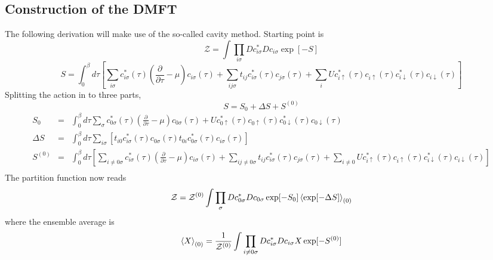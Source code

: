 \documentclass[a4paper]{article}
\begin{document}
\subsection{Construction of the DMFT} %
\label{sub:Construction of the DMFT}
The following derivation will make use of the so-called cavity method. Starting
point is
\begin{equation}
    \mathcal{Z} = \int \prod_{i\sigma} Dc^{*}_{i\sigma}Dc_{i\sigma} \exp [-S]
\end{equation}
\begin{equation}
    S = \int_{0}^{\beta} d\tau
        \left[
            \sum_{i\sigma} c^{*}_{i\sigma}(\tau)
            \left(\frac{\partial}{\partial\tau} - \mu \right)
            c_{i\sigma}(\tau)
           +\sum_{ij\sigma} t_{ij}c^{*}_{i\sigma}(\tau)c_{j\sigma}(\tau)
           +\sum_{i}Uc^{*}_{i\uparrow}(\tau)c_{i\uparrow}(\tau)
            c^{*}_{i\downarrow}(\tau)c_{i\downarrow}(\tau)
        \right]
\end{equation}
Splitting the action in to three parts,
\begin{equation}
    S = S_0 + \Delta S + S^{(0)}
\end{equation}
\begin{eqnarray}
    S_0 &=&
        \int_{0}^{\beta} d\tau
            \sum_{\sigma} c^{*}_{0\sigma}(\tau)
            \left(\frac{\partial}{\partial\tau} - \mu \right)
            c_{0\sigma}(\tau)
           +Uc^{*}_{0\uparrow}(\tau)c_{0\uparrow}(\tau)
            c^{*}_{0\downarrow}(\tau)c_{0\downarrow}(\tau) \\
    \Delta S &=&
        \int_{0}^{\beta} d\tau
            \sum_{i\sigma}
            [t_{i0}c^{*}_{i\sigma}(\tau)c_{0\sigma}(\tau)
             t_{0i}c^{*}_{0\sigma}(\tau)c_{i\sigma}(\tau)] \\
    S^{(0)} &=&
        \int_{0}^{\beta} d\tau
        \left[
            \sum_{i\neq0 \sigma}
                c^{*}_{i\sigma}(\tau)
                \left(\frac{\partial}{\partial\tau} - \mu \right)
                c_{i\sigma}(\tau)
           +\sum_{ij\neq0 \sigma}
                t_{ij}c^{*}_{i\sigma}(\tau)c_{j\sigma}(\tau)
           +\sum_{i\neq0}Uc^{*}_{i\uparrow}(\tau)c_{i\uparrow}(\tau)
            c^{*}_{i\downarrow}(\tau)c_{i\downarrow}(\tau)
        \right] \\
\end{eqnarray}
The partition function now reads
\begin{equation}
    \mathcal{Z} =
        \mathcal{Z}^{(0)}
        \int \prod_{\sigma} Dc^{*}_{0\sigma}Dc_{0\sigma}
            \exp[-S_{0}] \braket{\exp[-\Delta S]}_{(0)}
\end{equation}
where the ensemble average is
\begin{equation}
    \braket{X}_{(0)} = 
        \frac{1}{\mathcal{Z}^{(0)}} \int\prod_{i\neq0 \sigma}
            Dc^{*}_{i\sigma}Dc_{i\sigma} X \exp [-S^{(0)}]
\end{equation}
\end{document}
